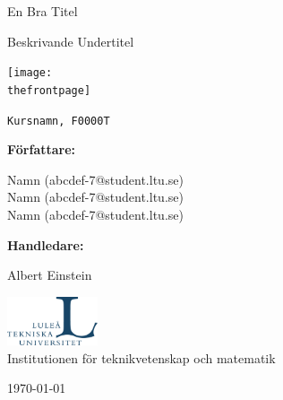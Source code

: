 
\def\thetitle{En Bra Titel}
\def\theundertitle{Beskrivande Undertitel}

\def\thefrontpage{framsida.png}

\def\thecourse{Kursnamn, F0000T}

\def\theauthor{
Namn (abcdef-7@student.ltu.se) \\
Namn (abcdef-7@student.ltu.se) \\ 
Namn (abcdef-7@student.ltu.se)
}

\def\thesupervisor{Albert Einstein}

\def\theinstitution{Institutionen för teknikvetenskap och matematik}


\begin{titlepage}
	\centering
	
	{\Huge \textrm{\thetitle} \par}
	{\Large \textrm{\theundertitle} \par}
	\vspace{0.8cm}
	
	\texttt{[image: \\thefrontpage]}\par
	\texttt{\thecourse}\par
	\vspace{0.8cm}
	
	{\textbf{Författare:} \par}
	{\large \theauthor\par} %
	\vspace{0.8cm}
	\textbf{Handledare:}\par
	\large{\thesupervisor}  %
	\vfill
	
    \includegraphics[width=0.2\textwidth]{Images/ltu_swe.jpg} \\
    \vspace{0.2cm}
    \textrm{\theinstitution} \\
	{\large \textrm{\today}\par}
\end{titlepage}